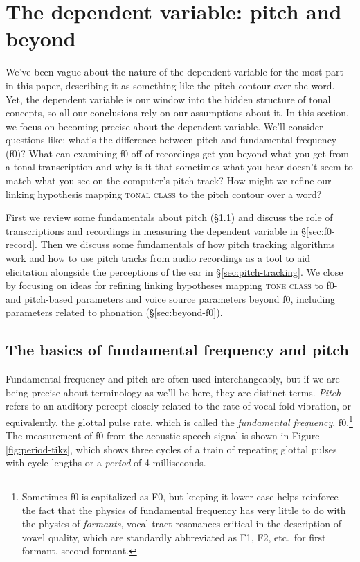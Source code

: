 \documentclass[12pt]{article}
\begin{document}
\section{The dependent variable: pitch and beyond}
\label{sec:pitch}

We've been vague about the nature of the dependent variable for the most
part in this paper, describing it as something like the pitch contour
over the word. Yet, the dependent variable is our window into the hidden structure of tonal
concepts, so all our conclusions rely on our assumptions about it. In this section, we focus on becoming precise about the
dependent variable. We'll consider questions like: what's the difference between pitch and
fundamental frequency (f0)? What can examining f0 off of recordings
get you beyond what you get from a tonal transcription and why is it
that sometimes what you hear doesn't seem to match what you see on the
computer's pitch track? How might we refine our linking hypothesis
mapping \textsc{tonal class} to the pitch contour over a word? 

First we review some fundamentals about pitch (\S\ref{sec:f0-basics})
and discuss the role of transcriptions and recordings in measuring the
dependent variable in \S\ref{sec:f0-record}. Then we discuss some
fundamentals of how pitch tracking algorithms work and how to use
pitch tracks from audio recordings as a tool to aid elicitation
alongside the perceptions of the ear in \S\ref{sec:pitch-tracking}.
We close by focusing on ideas for refining linking hypotheses mapping
\textsc{tone class} to f0- and pitch-based parameters and voice source
parameters beyond f0, including parameters related to phonation
(\S\ref{sec:beyond-f0}).

\subsection{The basics of fundamental frequency and pitch}
\label{sec:f0-basics}

Fundamental frequency and pitch are often used interchangeably, but if
we are being precise about terminology as we'll be here, they are
distinct terms. \textit{Pitch} refers to an auditory percept closely
related to the
rate of vocal fold vibration, or equivalently, the glottal pulse rate, which is called the \textit{fundamental
frequency}, f0.\footnote{Sometimes f0 is capitalized as F0, but
keeping it lower case helps reinforce the fact that the physics of
fundamental frequency has very little to do with the physics of
\textit{formants}, vocal tract resonances critical in the
description of vowel quality, which are standardly abbreviated as F1, F2, etc.\ for first
formant, second formant.} The measurement of f0 from the acoustic
speech signal is shown in Figure \ref{fig:period-tikz}, which shows
three cycles of a train of repeating glottal pulses with cycle lengths
or a \textit{period} of 4 milliseconds.  
\end{document}

